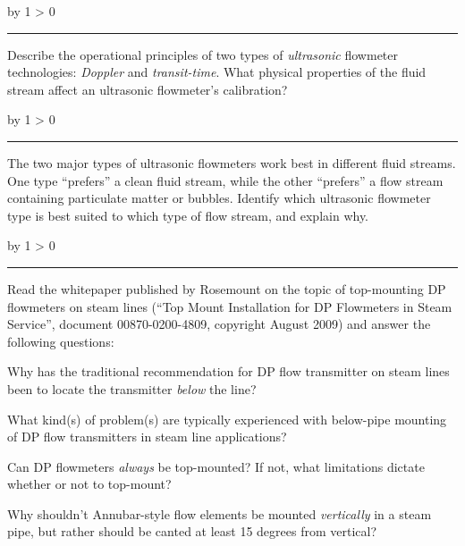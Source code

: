 \documentclass[12pt,a4paper]{article}
\def\oppgave{
            \advance\questnum by 1
            \ifnum \questnum > 0
                 \hrule
                 \vskip 3pt
                 \leftline{Oppgave \the\questnum}
                 \vskip 3pt \fi}
\begin{document}
\vskip 10pt \filbreak 
\oppgave{} 

Describe the operational principles of two types of {\it ultrasonic} flowmeter technologies: {\it Doppler} and {\it transit-time}.  What physical properties of the fluid stream affect an ultrasonic flowmeter's calibration?

\vskip 10pt \filbreak 
\oppgave{} 

The two major types of ultrasonic flowmeters work best in different fluid streams.  One type ``prefers'' a clean fluid stream, while the other ``prefers'' a flow stream containing particulate matter or bubbles.  Identify which ultrasonic flowmeter type is best suited to which type of flow stream, and explain why.

\vskip 10pt \filbreak 
\oppgave{} 

Read the whitepaper published by Rosemount on the topic of top-mounting DP flowmeters on steam lines (``Top Mount Installation for DP Flowmeters in Steam Service'', document 00870-0200-4809, copyright August 2009) and answer the following questions:

\vskip 30pt

Why has the traditional recommendation for DP flow transmitter on steam lines been to locate the transmitter {\it below} the line?

\vskip 50pt

What kind(s) of problem(s) are typically experienced with below-pipe mounting of DP flow transmitters in steam line applications?

\vskip 50pt

Can DP flowmeters {\it always} be top-mounted?  If not, what limitations dictate whether or not to top-mount?

\vskip 50pt

Why shouldn't Annubar-style flow elements be mounted {\it vertically} in a steam pipe, but rather should be canted at least 15 degrees from vertical?
\end{document}
